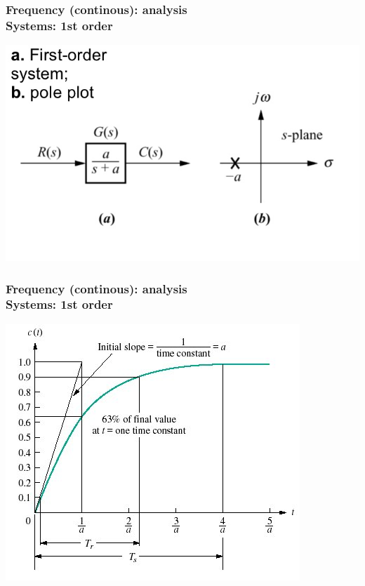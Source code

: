 \documentclass[hyperref={pdfpagelabels=true}]{beamer}
\begin{document}
\begin{frame}
\frametitle{Frequency (continous): analysis \\ {\large Systems: 1st order}}
\includegraphics[scale = 0.43]{figs/Selection_025.png}
\end{frame}

\begin{frame}
\frametitle{Frequency (continous): analysis \\ {\large Systems: 1st order}}
\includegraphics[scale = 0.58]{figs/Selection_026.jpg}
\end{frame}
\end{document}

